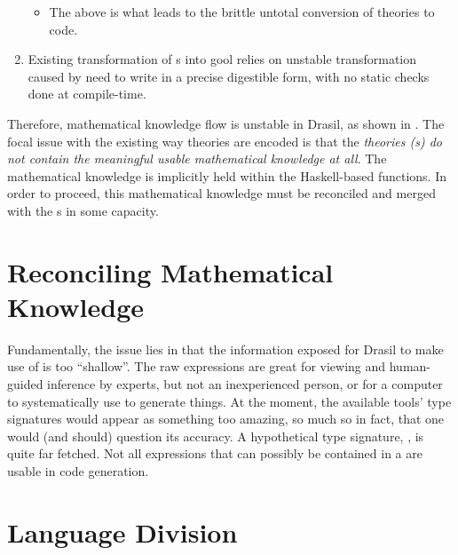 \begin{enumerate}
\begin{itemize}
		      \item The above is what leads to the brittle untotal conversion of
		            theories to code.

	      \end{itemize}

	\item Existing transformation of \RelationConcept{}s into \acs{gool} relies
	      on unstable transformation caused by need to write in a precise
	      digestible form, with no static checks done at compile-time.

\end{enumerate}

Therefore, mathematical knowledge flow is unstable in Drasil, as shown in
. The focal issue with the existing way theories
are encoded is that the \textit{theories (\RelationConcept{}s) do not contain
	the meaningful usable mathematical knowledge at all}. The mathematical knowledge
is implicitly held within the Haskell-based functions. In order to proceed, this mathematical knowledge
must be reconciled and merged with the \RelationConcept{}s in some capacity.

\theoriesWithoutModelKinds{}

\section{Reconciling Mathematical Knowledge}

Fundamentally, the issue lies in that the information exposed for Drasil to make
use of is too ``shallow''. The raw expressions are great for viewing and
human-guided inference by experts, but not an inexperienced person, or for a
computer to systematically use to generate things. At the moment, the available
tools' type signatures would appear as something too amazing, so much so in
fact, that one would (and should) question its accuracy. A hypothetical type
signature, , is quite far fetched. Not all
expressions that can possibly be contained in a \RelationConcept{} are usable in
code generation.

\section{Language Division}


